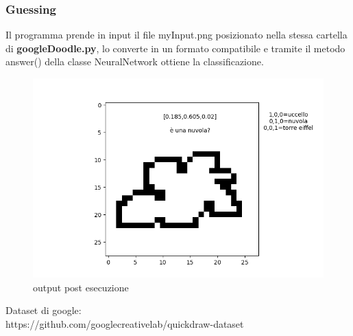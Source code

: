 \documentclass[12pt]{article}
\begin{document}
\subsubsection{Guessing}
Il programma prende in input il file myInput.png posizionato nella stessa cartella di \textbf{googleDoodle.py}, lo converte in un formato compatibile e tramite il metodo answer() della classe NeuralNetwork ottiene la classificazione.
\begin{figure}[h!]
	\centering
	\includegraphics[width=15 cm]{output.png}
	\caption{output post esecuzione}
	\label{fig:output}
\end{figure}
\newpage
\begin{thebibliography}{9}
Dataset di google:\\
https://github.com/googlecreativelab/quickdraw-dataset 
\end{thebibliography}
\end{document}
